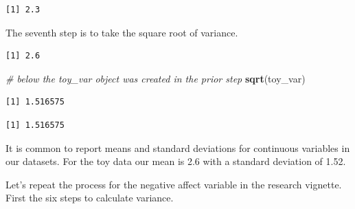 \documentclass[
  11pt,
]{book}
\newenvironment{Shaded}{\begin{snugshade}}{\end{snugshade}}
\newcommand{\CommentTok}[1]{\textcolor[rgb]{0.37,0.37,0.37}{\textit{#1}}}
\newcommand{\FunctionTok}[1]{\textcolor[rgb]{0.27,0.27,0.27}{\textbf{#1}}}
\newcommand{\NormalTok}[1]{#1}
\newcommand{\SpecialCharTok}[1]{\textcolor[rgb]{0.43,0.43,0.43}{\textbf{#1}}}
\begin{document}
\begin{verbatim}
[1] 2.3
\end{verbatim}

The seventh step is to take the square root of variance.

\begin{Shaded}
\end{Shaded}

\begin{verbatim}
[1] 2.6
\end{verbatim}

\begin{Shaded}
\begin{Highlighting}[]
\CommentTok{\# below the \textquotesingle{}toy\_var\textquotesingle{} object was created in the prior step}
\FunctionTok{sqrt}\NormalTok{(toy\_var)}
\end{Highlighting}
\end{Shaded}

\begin{verbatim}
[1] 1.516575
\end{verbatim}

\begin{Shaded}
\end{Shaded}

\begin{verbatim}
[1] 1.516575
\end{verbatim}

It is common to report means and standard deviations for continuous variables in our datasets. For the toy data our mean is 2.6 with a standard deviation of 1.52.

Let's repeat the process for the negative affect variable in the research vignette. First the six steps to calculate variance.
\end{document}
